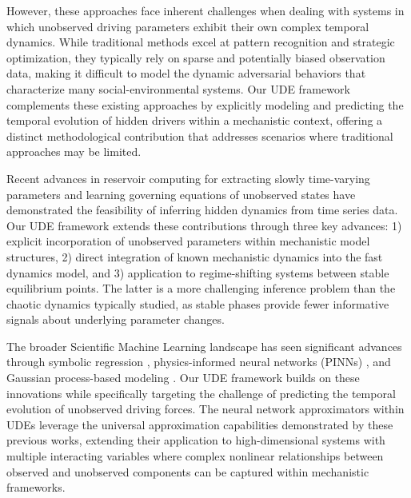 \documentclass[openacc]{rsproca_new}%
\begin{document}
However, these approaches face inherent challenges when dealing with systems in which unobserved driving parameters exhibit their own complex temporal dynamics. While traditional methods excel at pattern recognition and strategic optimization, they typically rely on sparse and potentially biased observation data, making it difficult to model the dynamic adversarial behaviors that characterize many social-environmental systems. Our UDE framework complements these existing approaches by explicitly modeling and predicting the temporal evolution of hidden drivers within a mechanistic context, offering a distinct methodological contribution that addresses scenarios where traditional approaches may be limited.

Recent advances in reservoir computing for extracting slowly time-varying parameters \cite{tokuda2024prediction} and learning governing equations of unobserved states \cite{grigorian2025learning} have demonstrated the feasibility of inferring hidden dynamics from time series data. Our UDE framework extends these contributions through three key advances: 1) explicit incorporation of unobserved parameters within mechanistic model structures, 2) direct integration of known mechanistic dynamics into the fast dynamics model, and 3) application to regime-shifting systems between stable equilibrium points. The latter is a more challenging inference problem than the chaotic dynamics typically studied, as stable phases provide fewer informative signals about underlying parameter changes.

The broader Scientific Machine Learning landscape has seen significant advances through symbolic regression \cite{angelis2023artificial}, physics-informed neural networks (PINNs) \cite{cuomo2022scientific}, and Gaussian process-based modeling \cite{girard2005gaussian}. Our UDE framework builds on these innovations while specifically targeting the challenge of predicting the temporal evolution of unobserved driving forces. The neural network approximators within UDEs leverage the universal approximation capabilities demonstrated by these previous works, extending their application to high-dimensional systems with multiple interacting variables where complex nonlinear relationships between observed and unobserved components can be captured within mechanistic frameworks.
\end{document}
